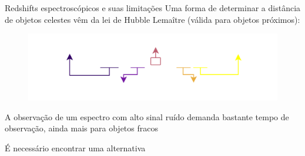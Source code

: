 \begin{frame}[c]{Redshifts espectroscópicos e suas limitações}
    Uma forma de determinar a distância de objetos celestes vêm da lei de Hubble Lemaître (válida para objetos próximos):
    \vspace*{-0.5cm}
    \begin{figure}
        \centering
        \includegraphics[width=0.8\linewidth]{script/images/hubble_law.png}
    \end{figure}
    \vspace*{-0.5cm}
    \begin{splusbox}{}
        \centering
        A observação de um espectro com alto sinal ruído demanda bastante tempo de observação, ainda mais para objetos fracos

        \vspace{0.3cm}
        É necessário encontrar uma alternativa
    \end{splusbox}
\end{frame}

